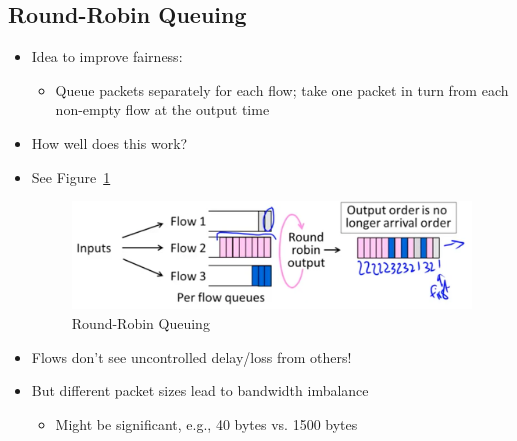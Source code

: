 \documentclass[12pt]{ctexart}   %
\begin{document}
	\subsection{Round-Robin Queuing}
	\begin{itemize}
		\item Idea to improve fairness:
		\begin{itemize}
			\item Queue packets separately for each flow; take one packet in turn from each non-empty flow at the output time
		\end{itemize}
		
		\item How well does this work?
		\item See Figure~\ref{fig:9-4-3}
		  
		 \begin{figure}[h!] %
		\centering
		 \includegraphics[scale=0.7]{images/9-4-3}
		\caption{ Round-Robin Queuing }
		 \label{fig:9-4-3}
		 \end{figure}
		 
		 \item Flows don't see uncontrolled delay/loss from others!
		 \item But different packet sizes lead to bandwidth imbalance
		 \begin{itemize}
		 	\item Might be significant, e.g., 40 bytes vs. 1500 bytes
		 \end{itemize}
	\end{itemize}
	
\end{document}
